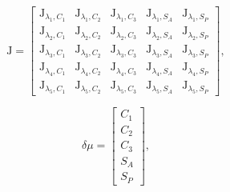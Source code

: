 \documentclass[twoside]{bhamthesis}
\theoremstyle{definition}
\begin{document}
\begin{figure}[!ht]
	\begin{minipage}{.7\textwidth}
   \begin{equation}
	\mathrm{J} = \left[ \begin{matrix} \mathrm{J}_{\lambda_{1},C_{1}} & \mathrm{J}_{\lambda_{1},C_{2}} & \mathrm{J}_{\lambda_{1},C_{3}} &   \mathrm{J}_{\lambda_{1},S_A} &   \mathrm{J}_{\lambda_{1},S_P}
\\ \mathrm{J}_{\lambda_{2},C_{1}} & \mathrm{J}_{\lambda_{2},C_{2}} & \mathrm{J}_{\lambda_{2},C_{3}} &   \mathrm{J}_{\lambda_{2},S_A} & \mathrm{J}_{\lambda_{2},S_P}
\\ \mathrm{J}_{\lambda_{3},C_{1}} & \mathrm{J}_{\lambda_{3},C_{2}} & \mathrm{J}_{\lambda_{3},C_{3}} &   \mathrm{J}_{\lambda_{3},S_A} & \mathrm{J}_{\lambda_{3},S_P}
\\ \mathrm{J}_{\lambda_{4},C_{1}} & \mathrm{J}_{\lambda_{4},C_{2}} & \mathrm{J}_{\lambda_{4},C_{3}} &   \mathrm{J}_{\lambda_{4},S_A} & \mathrm{J}_{\lambda_{4},S_P}
\\ \mathrm{J}_{\lambda_{5},C_{1}} & \mathrm{J}_{\lambda_{5},C_{2}} & \mathrm{J}_{\lambda_{5},C_{3}} &   \mathrm{J}_{\lambda_{5},S_A} & \mathrm{J}_{\lambda_{5},S_P}
\end{matrix} \right], 
  	\label{eqn:Spec_cons_jacob}
    \end{equation} 
  \end{minipage}%
  \begin{minipage}{.3\textwidth}
    \begin{equation}
\delta \mu = \left[ \begin{matrix} C_{1} 
\\ C_{2}
\\C_{3}
\\S_A
\\S_P
\end{matrix} \right],
  	\label{eqn:Oxy_Bouger}
    \end{equation}
  \end{minipage}
\end{figure}
\end{document}

